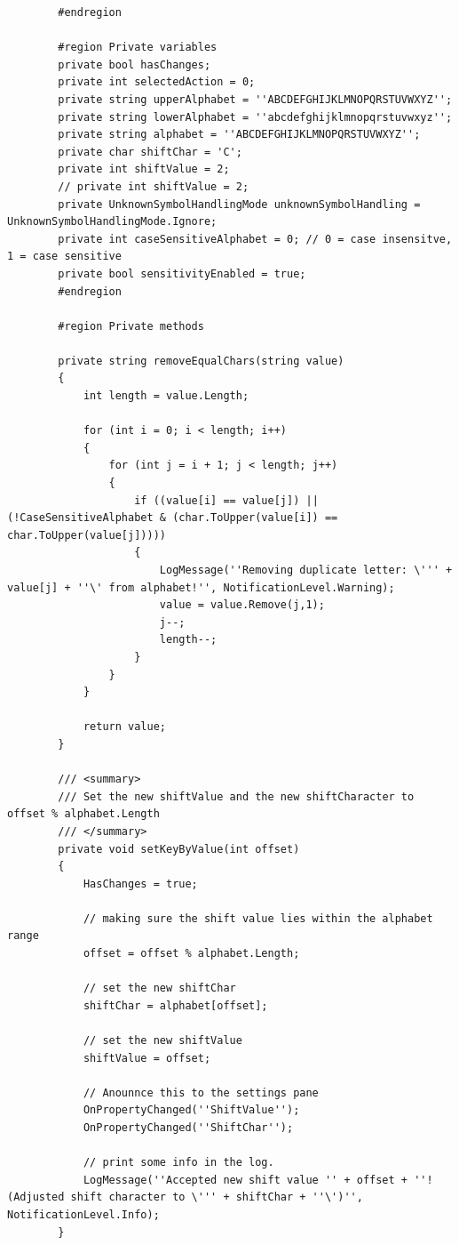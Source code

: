 \begin{lstlisting}
        #endregion

        #region Private variables
        private bool hasChanges;
        private int selectedAction = 0;
        private string upperAlphabet = ''ABCDEFGHIJKLMNOPQRSTUVWXYZ'';
        private string lowerAlphabet = ''abcdefghijklmnopqrstuvwxyz'';
        private string alphabet = ''ABCDEFGHIJKLMNOPQRSTUVWXYZ'';
        private char shiftChar = 'C';
        private int shiftValue = 2;
        // private int shiftValue = 2;
        private UnknownSymbolHandlingMode unknownSymbolHandling = UnknownSymbolHandlingMode.Ignore;
        private int caseSensitiveAlphabet = 0; // 0 = case insensitve, 1 = case sensitive
        private bool sensitivityEnabled = true;
        #endregion

        #region Private methods

        private string removeEqualChars(string value)
        {
            int length = value.Length;

            for (int i = 0; i < length; i++)
            {
                for (int j = i + 1; j < length; j++)
                {
                    if ((value[i] == value[j]) || (!CaseSensitiveAlphabet & (char.ToUpper(value[i]) == char.ToUpper(value[j]))))
                    {
                        LogMessage(''Removing duplicate letter: \''' + value[j] + ''\' from alphabet!'', NotificationLevel.Warning);
                        value = value.Remove(j,1);
                        j--;
                        length--;
                    }
                }
            }

            return value;
        }

        /// <summary>
        /// Set the new shiftValue and the new shiftCharacter to offset % alphabet.Length
        /// </summary>
        private void setKeyByValue(int offset)
        {
            HasChanges = true;

            // making sure the shift value lies within the alphabet range
            offset = offset % alphabet.Length;

            // set the new shiftChar
            shiftChar = alphabet[offset];

            // set the new shiftValue
            shiftValue = offset;

            // Anounnce this to the settings pane
            OnPropertyChanged(''ShiftValue'');
            OnPropertyChanged(''ShiftChar'');

            // print some info in the log.
            LogMessage(''Accepted new shift value '' + offset + ''! (Adjusted shift character to \''' + shiftChar + ''\')'', NotificationLevel.Info);
        }


\end{lstlisting}

